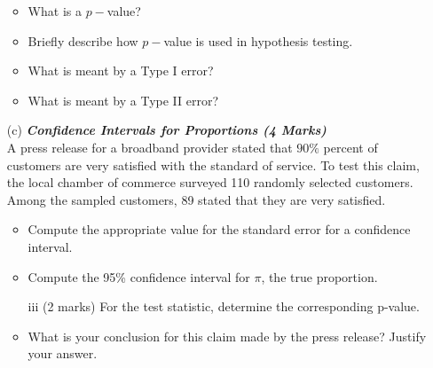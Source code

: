 \documentclass[]{article}
\begin{document}
\begin{itemize}
\begin{itemize}
\item  What is a $p-$value?

\item  Briefly describe how $p-$value is used in hypothesis testing.

\item  What is meant by a Type I error?

\item   What is meant by a Type II error?
\end{itemize}
\bigskip


\item[(c)] \textbf{\textit{Confidence Intervals for Proportions (4 Marks)}}\\
A press release for a broadband provider stated that $90\%$ percent of customers are very satisfied
with the standard of service. To test this claim, the local chamber of commerce surveyed 110 randomly selected customers. Among the sampled customers, 89 stated that they are very satisfied.





\begin{itemize}

\item  Compute the appropriate value for the standard error for a confidence interval.

\item  Compute the 95\% confidence interval for $\pi$, the true proportion.
%
\item[iii] (2 marks) For the test statistic, determine the corresponding p-value.

\item  What is your conclusion for this claim made by the press release? Justify your answer.
\end{itemize}
\end{itemize}
\end{document}
